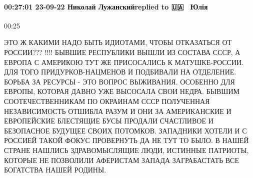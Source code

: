 \paragraph{00:27:01 23-09-22 Николай Лужанскийreplied to 🇺🇦💙💛 Юлія}
00:25

ЭТО
Ж КАКИМИ НАДО БЫТЬ ИДИОТАМИ, ЧТОБЫ
ОТКАЗАТЬСЯ ОТ РОССИИ??? !!!! БЫВШИЕ
РЕСПУБЛИКИ ВЫШЛИ ИЗ СОСТАВА СССР, А
ЕВРОПА С АМЕРИКОЮ ТУТ ЖЕ ПРИСОСАЛИСЬ К
МАТУШКЕ-РОССИИ. ДЛЯ ТОГО ПРИДУРКОВ-НАЦМЕНОВ
И ПОДБИВАЛИ НА ОТДЕЛЕНИЕ. БОРЬБА ЗА
РЕСУРСЫ - ЭТО ВОПРОС ВЫЖИВАНИЯ. ОСОБЕННО
ДЛЯ ЕВРОПЫ, КОТОРАЯ ДАВНО УЖЕ ВЫСОСАЛА
СВОИ НЕДРА. БЫВШИМ СООТЕЧЕСТВЕННИКАМ
ПО ОКРАИНАМ СССР ПОЛУЧЕННАЯ НЕЗАВИСИМОСТЬ
ОТШИБЛА РАЗУМ И ОНИ ЗА АМЕРИКАНСКИЕ И
ЕВРОПЕЙСКИЕ БЛЕСТЯЩИЕ БУСЫ ПРОДАЛИ
СЧАСТЛИВОЕ И БЕЗОПАСНОЕ БУДУЩЕЕ СВОИХ
ПОТОМКОВ. ЗАПАДНИКИ ХОТЕЛИ И С РОССИЕЙ
ТАКОЙ ФОКУС ПРОВЕРНУТЬ ДА НЕ ТУТ ТО
БЫЛО. В НАШЕЙ СТРАНЕ НАШЛИСЬ ЗДРАВОМЫСЛЯЩИЕ
ЛЮДИ, ИСТИННЫЕ ПАТРИОТЫ, КОТОРЫЕ НЕ
ПОЗВОЛИЛИ АФЕРИСТАМ ЗАПАДА ЗАГРАБАСТАТЬ
ВСЕ БОГАТСТВА НАШЕЙ РОДИНЫ.

